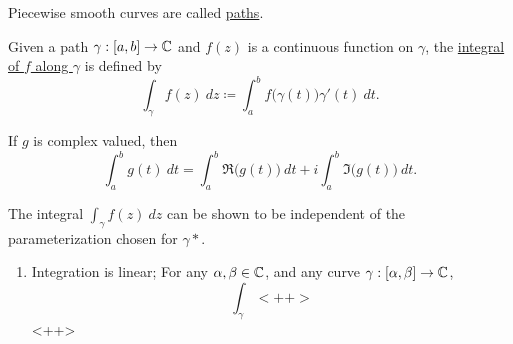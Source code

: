 \documentclass[11pt]{article}
\begin{document}
\begin{remark}
Piecewise smooth curves are called \underline{paths}.
\end{remark}
\begin{definition}
Given a path $\gamma:[a,b] \to \mathbb{C}$ and $f(z)$ is a continuous function on
$\gamma$, the \underline{integral of $f$ along $\gamma$} is defined by
\begin{equation*}
\int_\gamma f(z)\>dz \coloneqq \int^b_a f\big(\gamma(t)\big)\gamma'(t)\>dt.
\end{equation*}
\end{definition}
\begin{remark}
If $g$ is complex valued, then
\begin{equation*}
\int^b_a g(t)\>dt = \int^b_a \Re\big(g(t)\big)\> dt + i \int^b_a
\Im\big(g(t)\big)\> dt.
\end{equation*}
\end{remark}
\begin{remark}
The integral $\int_\gamma f(z)\>dz$ can be shown to be independent of the
parameterization chosen for $\gamma*$.
\end{remark}
\begin{theorem}\leavevmode
\begin{enumerate}
\item Integration is linear; For any $\alpha, \beta \in \mathbb{C}$, and any curve
$\gamma:[\alpha,\beta] \to \mathbb{C}$,
\begin{equation*}
\int_{\gamma}<++>
\end{equation*}<++>
\end{enumerate}
\end{theorem}
\end{document}
